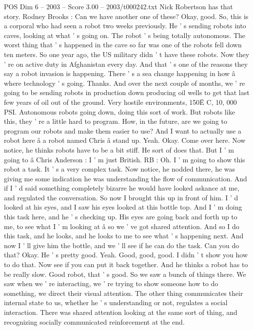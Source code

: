 \begin{textsample}{POS Dim 6 – 2003 – Score 3.00 – 2003/t000242.txt}
Nick Robertson has that story.
Rodney Brooks : Can we have another one of these?
Okay, good.
So, this is a corporal who had seen a robot two weeks previously.
He ' s sending robots into caves, looking at what ' s going on.
The robot ' s being totally autonomous.
The worst thing that ' s happened in the cave so far was one of the robots fell down ten meters.
So one year ago, the US military didn ' t have these robots.
Now they ' re on active duty in Afghanistan every day.
And that ' s one of the reasons they say a robot invasion is happening.
There ' s a sea change happening in how â where technology ' s going.
Thanks.
And over the next couple of months, we ' re going to be sending robots in production down producing oil wells to get that last few years of oil out of the ground.
Very hostile environments, 150Ë C, 10, 000 PSI.
Autonomous robots going down, doing this sort of work.
But robots like this, they ' re a little hard to program.
How, in the future, are we going to program our robots and make them easier to use?
And I want to actually use a robot here â a robot named Chris â stand up.
Yeah.
Okay.
Come over here.
Now notice, he thinks robots have to be a bit stiff.
He sort of does that.
But I ' m going to â Chris Anderson : I ' m just British.
RB : Oh.
I ' m going to show this robot a task.
It ' s a very complex task.
Now notice, he nodded there, he was giving me some indication he was understanding the flow of communication.
And if I ' d said something completely bizarre he would have looked askance at me, and regulated the conversation.
So now I brought this up in front of him.
I ' d looked at his eyes, and I saw his eyes looked at this bottle top.
And I ' m doing this task here, and he ' s checking up.
His eyes are going back and forth up to me, to see what I ' m looking at â so we ' ve got shared attention.
And so I do this task, and he looks, and he looks to me to see what ' s happening next.
And now I ' ll give him the bottle, and we ' ll see if he can do the task.
Can you do that?
Okay.
He ' s pretty good.
Yeah.
Good, good, good.
I didn ' t show you how to do that.
Now see if you can put it back together.
And he thinks a robot has to be really slow.
Good robot, that ' s good.
So we saw a bunch of things there.
We saw when we ' re interacting, we ' re trying to show someone how to do something, we direct their visual attention.
The other thing communicates their internal state to us, whether he ' s understanding or not, regulates a social interaction.
There was shared attention looking at the same sort of thing, and recognizing socially communicated reinforcement at the end.

\end{textsample}

